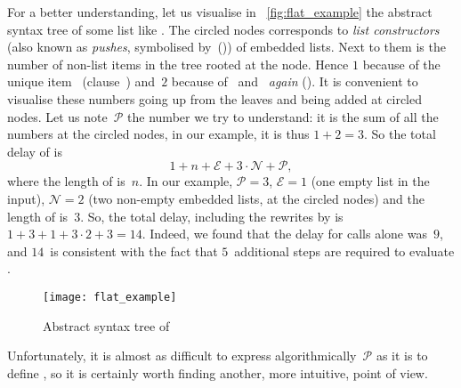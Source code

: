For a better understanding, let us visualise in
\fig~\vref{fig:flat_example} the abstract syntax tree of some list
like . The circled nodes corresponds to
\emph{list constructors} (also known as \emph{pushes}, symbolised
by~(\erlcode{|})) of embedded lists. Next to them is the number of
non\hyp{}list items in the tree rooted at the node. Hence \(1\)
because of the unique item~ (clause~\clause{\epsilon})
and~\(2\) because of ~and~ \emph{again}
(\clause{\zeta}). It is convenient to visualise these numbers going up
from the leaves and being added at circled nodes. Let us
note~\(\mathcal{P}\) the number we try to understand: it is the sum of
all the numbers at the circled nodes, in our example, it is thus \(1 +
2 = 3\). So the total delay of  is
\[
1 + n + \mathcal{E} + 3 \cdot \mathcal{N} + \mathcal{P},
\]
where the length of  is~\(n\). In our example,
\(\mathcal{P} = 3\), \(\mathcal{E} = 1\) (one empty list in the
input), \(\mathcal{N} = 2\) (two non\hyp{}empty embedded lists, at the
circled nodes) and the length of 
is~\(3\). So, the total delay, including the rewrites by
 is \( 1 + 3 + 1 + 3 \cdot 2 + 3 = 14\). Indeed, we
found that the delay for  calls alone was~\(9\), and
\(14\)~is consistent with the fact that \(5\)~additional steps are
required to evaluate .
\begin{figure}
\centering
\texttt{[image: flat\_example]}%
\caption{Abstract syntax tree of 
\label{fig:flat_example}}
\end{figure}
Unfortunately, it is almost as difficult to express
algorithmically~\(\mathcal{P}\) as it is to define ,
so it is certainly worth finding another, more intuitive, point of
view.

